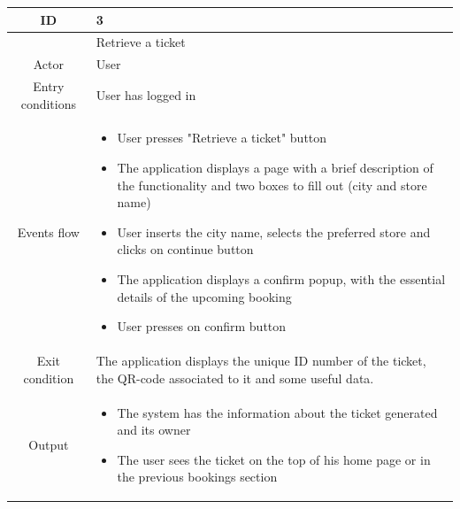 \documentclass[table, 12pt]{article}
\begin{document}
\begin{longtable}{|c| p{10cm}|}
    \hline ID        & 3                                                                                                                                                                                                        \\
    \hline
                     & Retrieve a ticket                                                                                                                                                                                        \\
    \hline
    Actor            & User                                                                                                                                                                                                     \\
    \hline
    Entry conditions & User has logged in                                                                                                                                                                                       \\
    \hline
    Events flow      & \begin{itemize}[nosep,after=\strut]
        \item User presses "Retrieve a ticket" button
        \item The application displays a page with a brief description of the functionality and two boxes to fill out (city and store name)
        \item User inserts the city name, selects the preferred store and clicks on continue button
        \item The application displays a confirm popup, with the essential details of the upcoming booking
        \item User presses on confirm button
    \end{itemize}                                                                                                                                                                               \\
    \hline
    Exit condition   &
    The application displays the unique ID number of the ticket, the QR-code associated to it and some useful data.                                                                                                             \\
    \hline
    Output           & \begin{itemize}
        \item   The system has the information about the ticket generated and its owner
        \item The user sees the ticket on the top of his home page or in the previous bookings section


\end{itemize}
\end{longtable}
\end{document}
